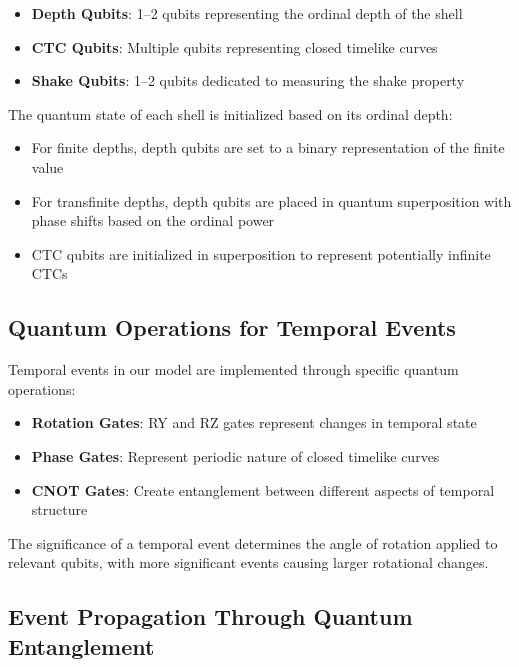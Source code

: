 \documentclass[12pt,a4paper]{article}
\begin{document}
\begin{itemize}
    \item \textbf{Depth Qubits}: 1--2 qubits representing the ordinal depth of the shell
    \item \textbf{CTC Qubits}: Multiple qubits representing closed timelike curves
    \item \textbf{Shake Qubits}: 1--2 qubits dedicated to measuring the shake property
\end{itemize}

The quantum state of each shell is initialized based on its ordinal depth:

\begin{itemize}
    \item For finite depths, depth qubits are set to a binary representation of the finite value
    \item For transfinite depths, depth qubits are placed in quantum superposition with phase shifts based on the ordinal power
    \item CTC qubits are initialized in superposition to represent potentially infinite CTCs
\end{itemize}

\subsection{Quantum Operations for Temporal Events}

Temporal events in our model are implemented through specific quantum operations:

\begin{itemize}
    \item \textbf{Rotation Gates}: RY and RZ gates represent changes in temporal state
    \item \textbf{Phase Gates}: Represent periodic nature of closed timelike curves \citep{deutsch, visser}
    \item \textbf{CNOT Gates}: Create entanglement between different aspects of temporal structure
\end{itemize}

The significance of a temporal event determines the angle of rotation applied to relevant qubits, with more significant events causing larger rotational changes.

\subsection{Event Propagation Through Quantum Entanglement}
\end{document}
